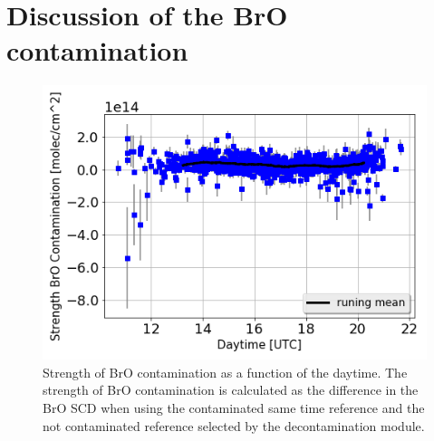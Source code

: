 \documentclass  [
  paper    = a4,
  BCOR     = 10mm,
  twoside,
  fontsize = 12pt,
  fleqn,
  toc      = bibnumbered,
  toc      = listofnumbered,
  numbers  = noendperiod,
  headings = normal,
  listof   = leveldown,
  version  = 3.03
]                                       {scrreprt}
\begin{document}
\FloatBarrier
\section{Discussion of the BrO contamination}
\begin{figure}
	\centering
	\includegraphics[width=0.6\linewidth]{Bilder/bro_contdaytime}
	\caption{Strength of BrO contamination as a function of the daytime. The strength of BrO contamination is calculated as the difference in the BrO SCD when using the contaminated same time reference and the not contaminated reference selected by the decontamination module.}
	\label{fig:brocontdaytime}
\end{figure}
\end{document}
